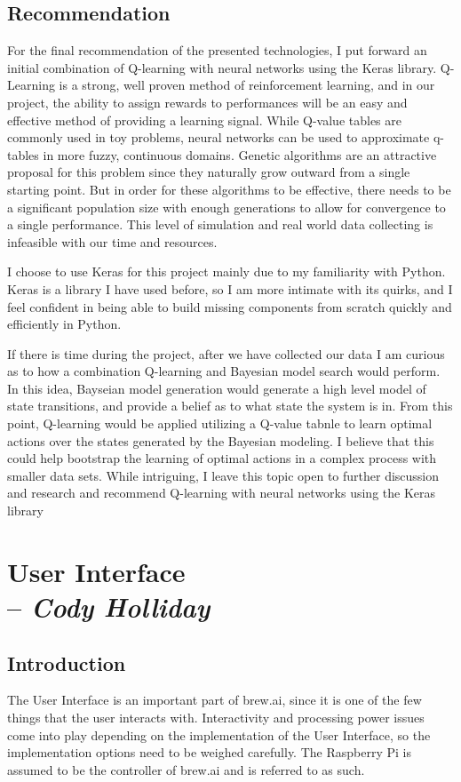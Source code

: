 \documentclass[draftclsnofoot,onecolumn,letterpaper,10pt]{IEEEtran}
\begin{document}
\subsection{Recommendation}
For the final recommendation of the presented technologies, I put forward an initial combination of Q-learning with neural networks using the Keras library.
Q-Learning is a strong, well proven method of reinforcement learning, and in our project, the ability to assign rewards to performances will be an easy and effective method of providing a learning signal.
While Q-value tables are commonly used in toy problems, neural networks can be used to approximate q-tables in more fuzzy, continuous domains.
Genetic algorithms are an attractive proposal for this problem since they naturally grow outward from a single starting point.
But in order for these algorithms to be effective, there needs to be a significant population size with enough generations to allow for convergence to a single performance.
This level of simulation and real world data collecting is infeasible with our time and resources.

I choose to use Keras for this project mainly due to my familiarity with Python. 
Keras is a library I have used before, so I am more intimate with its quirks, and I feel confident in being able to build missing components from scratch quickly and efficiently in Python.

If there is time during the project, after we have collected our data I am curious as to how a combination Q-learning and Bayesian model search would perform.
In this idea, Bayseian model generation would generate a high level model of state transitions, and provide a belief as to what state the system is in.
From this point, Q-learning would be applied utilizing a Q-value tabnle to learn optimal actions over the states generated by the Bayesian modeling.
I believe that this could help bootstrap the learning of optimal actions in a complex process with smaller data sets.
While intriguing, I leave this topic open to further discussion and research and recommend Q-learning with neural networks using the Keras library
\newpage
\section{User Interface \\ -- \textbf{\textit{Cody Holliday}}}
\subsection{Introduction}
The User Interface is an important part of brew.ai, since it is one of the few things that the user interacts with.
Interactivity and processing power issues come into play depending on the implementation of the User Interface, so the implementation options need to be weighed carefully.
The Raspberry Pi is assumed to be the controller of brew.ai and is referred to as such.
\end{document}
